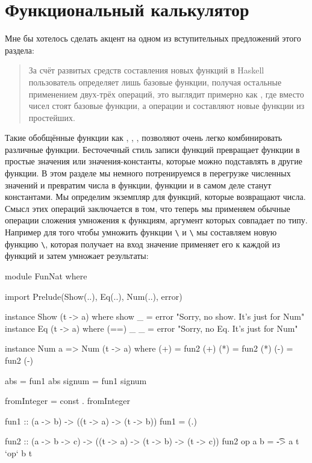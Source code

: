 \section{Функциональный калькулятор}

Мне бы хотелось сделать акцент на одном из вступительных 
предложений этого раздела:

\begin{quote}
За счёт развитых средств составления новых функций в Haskell пользователь 
определяет лишь базовые функции, получая остальные 
применением двух-трёх операций, это выглядит примерно как ,
где вместо чисел стоят базовые функции, а операции \In{+} и \In{*} составляют
новые функции из простейших.
\end{quote}

Такие обобщённые функции как , , , 
 позволяют очень легко комбинировать различные функции.
Бесточечный стиль записи функций превращает функции
в простые значения или значения-константы, которые можно 
подставлять в другие функции. 
В этом разделе мы немного потренируемся в перегрузке численных значений и
превратим числа в функции, функции и в самом деле станут 
константами. Мы определим экземпляр  для функций,
которые возвращают числа. Смысл этих операций заключается
в том, что теперь мы применяем обычные операции сложения умножения
к функциям, аргумент которых совпадает по типу. Например для того 
чтобы умножить функции \verb!\! и
\verb!\! мы составляем новую функцию
\verb!\!, которая получает на
вход значение  применяет его к каждой из функций 
и затем умножает результаты:

\begin{code}
module FunNat where

import Prelude(Show(..), Eq(..), Num(..), error)

instance Show (t -> a) where
    show _ = error "Sorry, no show. It's just for Num"
instance Eq (t -> a) where
    (==) _ _ = error "Sorry, no Eq. It's just for Num"

instance Num a => Num (t -> a) where
    (+) = fun2 (+)
    (*) = fun2 (*)
    (-) = fun2 (-)

    abs      = fun1 abs
    signum   = fun1 signum

    fromInteger = const . fromInteger

fun1 :: (a -> b) -> ((t -> a) -> (t -> b))
fun1 = (.)

fun2 :: (a -> b -> c) -> ((t -> a) -> (t -> b) -> (t -> c))
fun2 op a b = \t -> a t `op` b t
\end{code}

